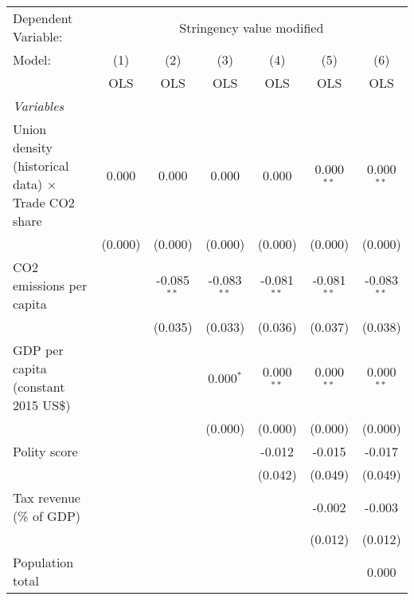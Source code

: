 
\begingroup
\centering
\begin{tabular}{lcccccc}
   \toprule
   Dependent Variable: & \multicolumn{6}{c}{Stringency value modified}\\
   Model:                                                    & (1)     & (2)           & (3)           & (4)           & (5)           & (6)\\  
                                                             &  OLS    & OLS           & OLS           & OLS           & OLS           & OLS\\  
   \midrule
   \emph{Variables}\\
   Union density (historical data) $\times$ Trade CO2 share  & 0.000   & 0.000         & 0.000         & 0.000         & 0.000$^{**}$  & 0.000$^{**}$\\   
                                                             & (0.000) & (0.000)       & (0.000)       & (0.000)       & (0.000)       & (0.000)\\   
   CO2 emissions per capita                                  &         & -0.085$^{**}$ & -0.083$^{**}$ & -0.081$^{**}$ & -0.081$^{**}$ & -0.083$^{**}$\\   
                                                             &         & (0.035)       & (0.033)       & (0.036)       & (0.037)       & (0.038)\\   
   GDP per capita (constant 2015 US\$)                       &         &               & 0.000$^{*}$   & 0.000$^{**}$  & 0.000$^{**}$  & 0.000$^{**}$\\   
                                                             &         &               & (0.000)       & (0.000)       & (0.000)       & (0.000)\\   
   Polity score                                              &         &               &               & -0.012        & -0.015        & -0.017\\   
                                                             &         &               &               & (0.042)       & (0.049)       & (0.049)\\   
   Tax revenue (\% of GDP)                                   &         &               &               &               & -0.002        & -0.003\\   
                                                             &         &               &               &               & (0.012)       & (0.012)\\   
   Population total                                          &         &               &               &               &               & 0.000\\   

\end{tabular}
